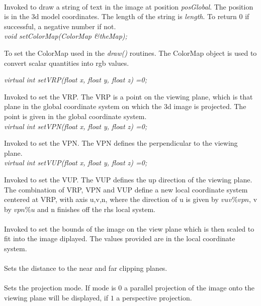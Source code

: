 \\
Invoked to draw a string of text in the image at position {\em
posGlobal}. The position is in the 3d model coordinates. The length of
the string is {\em length}. To return $0$ if successful, a negative
number if not.\\ 

{\em void setColorMap(ColorMap \&theMap);}

To set the ColorMap used in the {\em draw()} routines. The ColorMap
object is used to convert scalar quantities into rgb values. 


{\em virtual int setVRP(float x, float y, float z) =0;}

Invoked to set the VRP. The VRP is a point on the viewing plane, which
is that plane in the global coordinate system on which the 3d image is
projected. The point is given in the global coordinate system. \\

{\em virtual int setVPN(float x, float y, float z) =0;}

Invoked to set the VPN. The VPN defines the perpendicular to the
viewing plane. \\

{\em virtual int setVUP(float x, float y, float z) =0;}

Invoked to set the VUP. The VUP defines the up direction of the
viewing plane. The combination of VRP, VPN and VUP define a new local
coordinate system centered at VRP, with axis u,v,n, where the
direction of u is given by $vuv \% vpn$, v by $vpn \% u$ and n
finishes off the rhs local system. \\

\\
Invoked to set the bounds of the image on the view plane which is then
scaled to fit into the image diplayed. The values provided are in the
local coordinate system. \\

\\
Sets the distance to the near and far clipping planes. \\

\\ 
Sets the projection mode. If mode is $0$ a parallel projection of the
image onto the viewing plane will be displayed, if $1$ a perspective
projection. \\

